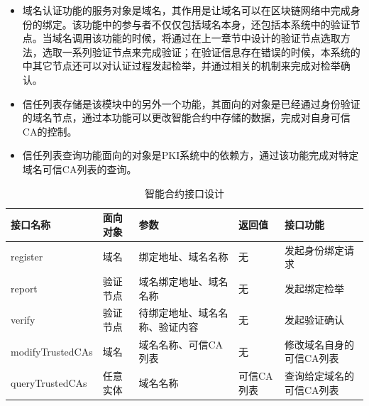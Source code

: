 \begin{itemize}
	\item 
	\noindent{}

	域名认证功能的服务对象是域名，其作用是让域名可以在区块链网络中完成身份的绑定。该功能中的参与者不仅仅包括域名本身，还包括本系统中的验证节点。当域名调用该功能的时候，将通过在上一章节中设计的验证节点选取方法，选取一系列验证节点来完成验证；在验证信息存在错误的时候，本系统的中其它节点还可以对认证过程发起检举，并通过相关的机制来完成对检举确认。

	\item 
	\noindent{}

	信任列表存储是该模块中的另外一个功能，其面向的对象是已经通过身份验证的域名节点，通过本功能可以更改智能合约中存储的数据，完成对自身可信CA的控制。

	\item
	\noindent{}

	信任列表查询功能面向的对象是PKI系统中的依赖方，通过该功能完成对特定域名可信CA列表的查询。

\end{itemize}




\begin{table}[h] %
\centering
\begin{tabular}{p{3.2cm}|p{2cm}|p{2.5cm}|p{2cm}|p{4cm}} %
\hline  
 接口名称 & 面向对象 & 参数 & 返回值 & 接口功能\\ %
\hline
register & 域名 & 绑定地址、域名名称 & 无 & 发起身份绑定请求 \\
\hline 
report & 验证节点 & 域名绑定地址、域名名称 & 无 & 发起绑定检举 \\
\hline 
verify & 验证节点 & 待绑定地址、域名名称、验证内容 & 无 & 发起验证确认 \\
\hline 
modifyTrustedCAs & 域名 & 域名名称、可信CA列表 & 无 & 修改域名自身的可信CA列表 \\
\hline 
queryTrustedCAs & 任意实体 & 域名名称 & 可信CA列表 & 查询给定域名的可信CA列表 \\
\hline 
\end{tabular}  
\caption{智能合约接口设计}\label{table:smartContractInterface} %
\end{table} 

